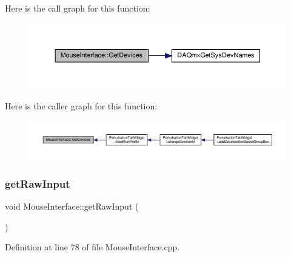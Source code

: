 Here is the call graph for this function\+:
\nopagebreak
\begin{figure}[H]
\begin{center}
\leavevmode
\includegraphics[width=350pt]{class_mouse_interface_ae6345485870f61952b488823e6b56d76_cgraph}
\end{center}
\end{figure}
Here is the caller graph for this function\+:
\nopagebreak
\begin{figure}[H]
\begin{center}
\leavevmode
\includegraphics[width=350pt]{class_mouse_interface_ae6345485870f61952b488823e6b56d76_icgraph}
\end{center}
\end{figure}
\mbox{\label{class_mouse_interface_ac1ad8eb6785b8a18c368faa8610494a7}} 
\subsubsection{\texorpdfstring{get\+Raw\+Input}{getRawInput}}
{\footnotesize\ttfamily void Mouse\+Interface\+::get\+Raw\+Input (\begin{DoxyParamCaption}{ }\end{DoxyParamCaption})\hspace{0.3cm}{\ttfamily [slot]}}



Definition at line 78 of file Mouse\+Interface.\+cpp.

